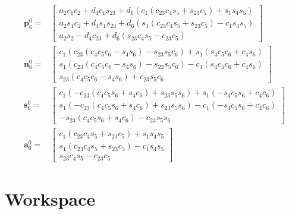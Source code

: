 \documentclass[10pt]{article}
\begin{document}
$$
\begin{aligned}
\boldsymbol{p}_{6}^{0}=&\left[\begin{array}{c}
a_{2} c_{1} c_{2}+d_{4} c_{1} s_{23}+d_{6}\left(c_{1}\left(c_{23} c_{4} s_{5}+s_{23} c_{5}\right)+s_{1} s_{4} s_{5}\right) \\
a_{2} s_{1} c_{2}+d_{4} s_{1} s_{23}+d_{6}\left(s_{1}\left(c_{23} c_{4} s_{5}+s_{23} c_{5}\right)-c_{1} s_{4} s_{5}\right) \\
a_{2} s_{2}-d_{4} c_{23}+d_{6}\left(s_{23} c_{4} s_{5}-c_{23} c_{5}\right)
\end{array}\right]\\
\boldsymbol{n}_{6}^{0}= & {\left[\begin{array}{c}
c_{1}\left(c_{23}\left(c_{4} c_{5} c_{6}-s_{4} s_{6}\right)-s_{23} s_{5} c_{6}\right)+s_{1}\left(s_{4} c_{5} c_{6}+c_{4} s_{6}\right) \\
s_{1}\left(c_{23}\left(c_{4} c_{5} c_{6}-s_{4} s_{6}\right)-s_{23} s_{5} c_{6}\right)-c_{1}\left(s_{4} c_{5} c_{6}+c_{4} s_{6}\right) \\
s_{23}\left(c_{4} c_{5} c_{6}-s_{4} s_{6}\right)+c_{23} s_{5} c_{6}
\end{array}\right] } \\
\boldsymbol{s}_{6}^{0}= & {\left[\begin{array}{c}
c_{1}\left(-c_{23}\left(c_{4} c_{5} s_{6}+s_{4} c_{6}\right)+s_{23} s_{5} s_{6}\right)+s_{1}\left(-s_{4} c_{5} s_{6}+c_{4} c_{6}\right) \\
s_{1}\left(-c_{23}\left(c_{4} c_{5} s_{6}+s_{4} c_{6}\right)+s_{23} s_{5} s_{6}\right)-c_{1}\left(-s_{4} c_{5} s_{6}+c_{4} c_{6}\right) \\
-s_{23}\left(c_{4} c_{5} s_{6}+s_{4} c_{6}\right)-c_{23} s_{5} s_{6}
\end{array}\right] } \\
\boldsymbol{a}_{6}^{0}= & {\left[\begin{array}{c}
c_{1}\left(c_{23} c_{4} s_{5}+s_{23} c_{5}\right)+s_{1} s_{4} s_{5} \\
s_{1}\left(c_{23} c_{4} s_{5}+s_{23} c_{5}\right)-c_{1} s_{4} s_{5} \\
s_{23} c_{4} s_{5}-c_{23} c_{5}
\end{array}\right] }
\end{aligned}
$$









\section{Workspace}
\end{document}
